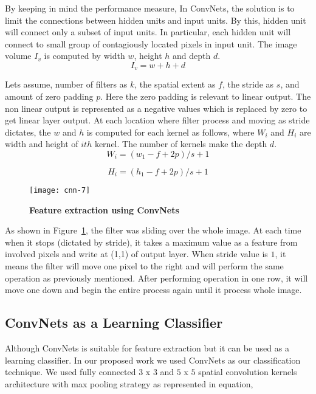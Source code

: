 \documentclass[conference]{IEEEtran}
\begin{document}
By keeping in mind the performance measure, In ConvNets, the solution is to limit the connections between hidden units and input units.
By this, hidden unit will connect only a subset of input units.
In particular, each hidden unit will connect to small group of contagiously located pixels in input unit.
The image volume $I_v$ is computed by width $w$, height $h$ and depth $d$.
\begin{equation}
    I_v = w+h+d
\end{equation}

Lets assume, number of filters as $k$,
the spatial extent as $f$, the stride as $s$, and amount of zero padding $p$.
Here the zero padding is relevant to linear output. The non linear output is represented as a negative values which is replaced by zero to get linear layer output.
At each location where filter process and moving as stride dictates, the $w$ and $h$ is computed for each kernel as follows,
where $W_i$ and $H_i$ are width and height of $ith$ kernel.
The number of kernels make the depth $d$.
\begin{equation}
W_i= (w_1-f+2p)/s+1
\end{equation}

\begin{equation}
H_i= (h_1-f+2p)/s+1
\end{equation}

\begin{figure}[H]
\centering
\texttt{[image: cnn-7]}
\caption{\bf Feature extraction using ConvNets}
\label{feature}
\end{figure}

    As shown in Figure~\ref{feature}, the filter was sliding over the whole image.
    At each time when it stops (dictated by stride), it takes a maximum value as a feature from involved pixels and write at (1,1) of output layer.
    When stride value is $1$, it means the filter will move one pixel to the right and will perform the same operation as previously mentioned.
    After performing operation in one row, it will move one down and begin the entire process again until it process whole image.

\subsection{ConvNets as a Learning Classifier}
Although ConvNets is suitable for feature extraction but it can be used as a learning classifier.
In our proposed work we used ConvNets as our classification technique.
We used fully connected $3$ x $3$ and $5$ x $5$ spatial convolution kernels architecture with max pooling strategy as represented in equation,
\end{document}
